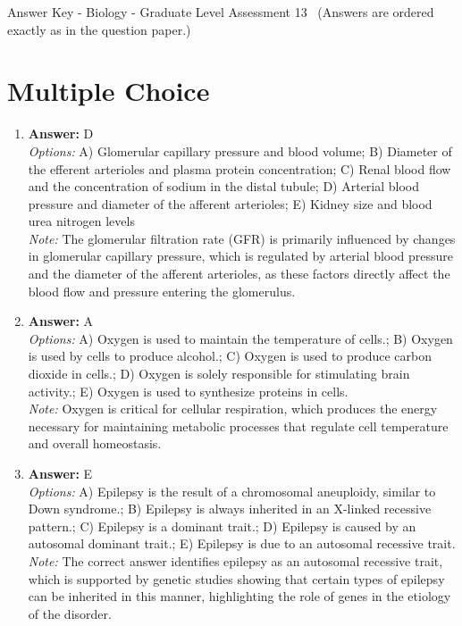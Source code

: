 \documentclass[12pt]{article}
\begin{document}
\begin{center}
Answer Key - Biology - Graduate Level Assessment 13 \
\small (Answers are ordered exactly as in the question paper.)
\end{center}

\section*{Multiple Choice}
\begin{enumerate}[label=\arabic*.]
\item \textbf{Answer:} D
\\ \textit{Options:} A) Glomerular capillary pressure and blood volume; B) Diameter of the efferent arterioles and plasma protein concentration; C) Renal blood flow and the concentration of sodium in the distal tubule; D) Arterial blood pressure and diameter of the afferent arterioles; E) Kidney size and blood urea nitrogen levels
\\ \textit{Note:} The glomerular filtration rate (GFR) is primarily influenced by changes in glomerular capillary pressure, which is regulated by arterial blood pressure and the diameter of the afferent arterioles, as these factors directly affect the blood flow and pressure entering the glomerulus.
\item \textbf{Answer:} A
\\ \textit{Options:} A) Oxygen is used to maintain the temperature of cells.; B) Oxygen is used by cells to produce alcohol.; C) Oxygen is used to produce carbon dioxide in cells.; D) Oxygen is solely responsible for stimulating brain activity.; E) Oxygen is used to synthesize proteins in cells.
\\ \textit{Note:} Oxygen is critical for cellular respiration, which produces the energy necessary for maintaining metabolic processes that regulate cell temperature and overall homeostasis.
\item \textbf{Answer:} E
\\ \textit{Options:} A) Epilepsy is the result of a chromosomal aneuploidy, similar to Down syndrome.; B) Epilepsy is always inherited in an X-linked recessive pattern.; C) Epilepsy is a dominant trait.; D) Epilepsy is caused by an autosomal dominant trait.; E) Epilepsy is due to an autosomal recessive trait.
\\ \textit{Note:} The correct answer identifies epilepsy as an autosomal recessive trait, which is supported by genetic studies showing that certain types of epilepsy can be inherited in this manner, highlighting the role of genes in the etiology of the disorder.

\end{enumerate}
\end{document}
